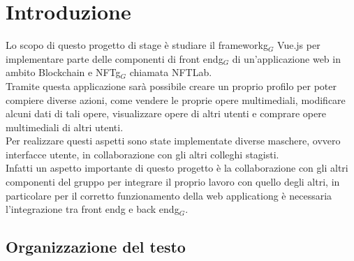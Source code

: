 
\chapter{Introduzione}
\label{cap:introduzione}

Lo scopo di questo progetto di stage è studiare il \gls{frameworkg}$_G$ Vue.js per implementare parte delle componenti di \gls{front endg}$_G$ di un'applicazione web in ambito Blockchain e \gls{NFTg}$_G$ chiamata NFTLab. \\
Tramite questa applicazione sarà possibile creare un proprio profilo per poter compiere diverse azioni, come vendere le proprie opere multimediali, modificare alcuni dati di tali opere, visualizzare opere di altri utenti e comprare opere multimediali di altri utenti. \\
Per realizzare questi aspetti sono state implementate diverse maschere, ovvero interfacce utente, in collaborazione con gli altri colleghi stagisti.\\
Infatti un aspetto importante di questo progetto è la collaborazione con gli altri componenti del gruppo per integrare il proprio lavoro con quello degli altri, in particolare per il corretto funzionamento della \gls{web applicationg} è necessaria l'integrazione tra \gls{front endg} e \gls{back endg}$_G$.


\section{Organizzazione del testo}
\label{sec:organizzazione-testo}

